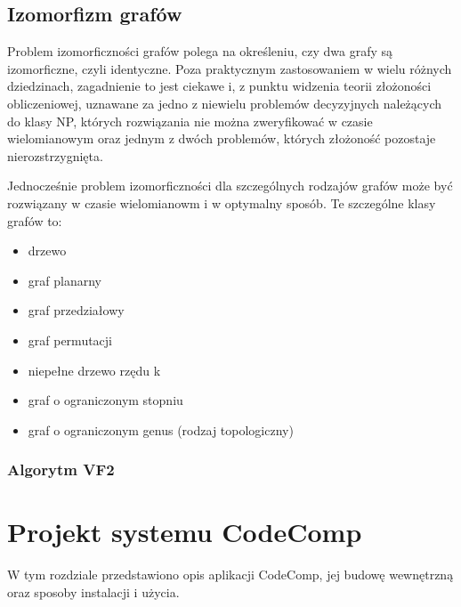 \documentclass[a4paper,12pt]{article}
\begin{document}
\newpage

\subsection{Izomorfizm grafów}

Problem izomorficzności grafów polega na określeniu, czy dwa grafy są izomorficzne, czyli identyczne. Poza praktycznym zastosowaniem w wielu różnych dziedzinach, zagadnienie to jest ciekawe i, z punktu widzenia teorii złożoności obliczeniowej, uznawane za jedno z niewielu problemów decyzyjnych należących do klasy NP, których rozwiązania nie można zweryfikować w czasie wielomianowym oraz jednym z dwóch problemów, których złożoność pozostaje nierozstrzygnięta\cite{np}.

Jednocześnie problem izomorficzności dla szczególnych rodzajów grafów może być rozwiązany w czasie wielomianowm i w optymalny sposób. Te szczególne klasy grafów to:
\begin{itemize}
\item drzewo\cite{iso_tree}
\item graf planarny\cite{iso_planar}
\item graf przedziałowy\cite{iso_interval}
\item graf permutacji\cite{iso_perm}
\item niepełne drzewo rzędu k\cite{iso_ktree}
\item graf o ograniczonym stopniu\cite{iso_degree}
\item graf o ograniczonym genus (rodzaj topologiczny)\cite{iso_genus}
\end{itemize}




\subsubsection{Algorytm VF2}

\cite{vf2}

\newpage

\section{Projekt systemu CodeComp}

W tym rozdziale przedstawiono opis aplikacji CodeComp, jej budowę wewnętrzną oraz sposoby instalacji i użycia.
\end{document}
